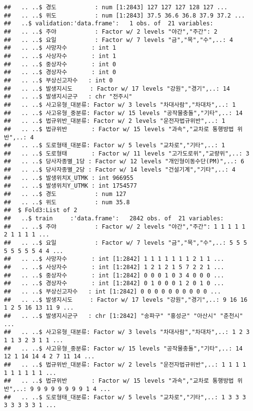 \documentclass[]{article}
\begin{document}
\begin{verbatim}
##   .. ..$ 경도           : num [1:2843] 127 127 127 128 127 ...
##   .. ..$ 위도           : num [1:2843] 37.5 36.6 36.8 37.9 37.2 ...
##   ..$ validation:'data.frame':   1 obs. of  21 variables:
##   .. ..$ 주야           : Factor w/ 2 levels "야간","주간": 2
##   .. ..$ 요일           : Factor w/ 7 levels "금","목","수",..: 4
##   .. ..$ 사망자수       : int 1
##   .. ..$ 사상자수       : int 1
##   .. ..$ 중상자수       : int 0
##   .. ..$ 경상자수       : int 0
##   .. ..$ 부상신고자수   : int 0
##   .. ..$ 발생지시도     : Factor w/ 17 levels "강원","경기",..: 14
##   .. ..$ 발생지시군구   : chr "전주시"
##   .. ..$ 사고유형_대분류: Factor w/ 3 levels "차대사람","차대차",..: 1
##   .. ..$ 사고유형_중분류: Factor w/ 15 levels "공작물충돌","기타",..: 14
##   .. ..$ 법규위반_대분류: Factor w/ 2 levels "운전자법규위반",..: 1
##   .. ..$ 법규위반       : Factor w/ 15 levels "과속","교차로 통행방법 위반",..: 4
##   .. ..$ 도로형태_대분류: Factor w/ 5 levels "교차로","기타",..: 1
##   .. ..$ 도로형태       : Factor w/ 11 levels "고가도로위","교량위",..: 3
##   .. ..$ 당사자종별_1당 : Factor w/ 12 levels "개인형이동수단(PM)",..: 6
##   .. ..$ 당사자종별_2당 : Factor w/ 14 levels "건설기계","기타",..: 4
##   .. ..$ 발생위치X_UTMK : int 966955
##   .. ..$ 발생위치Y_UTMK : int 1754577
##   .. ..$ 경도           : num 127
##   .. ..$ 위도           : num 35.8
##  $ Fold3:List of 2
##   ..$ train     :'data.frame':   2842 obs. of  21 variables:
##   .. ..$ 주야           : Factor w/ 2 levels "야간","주간": 1 1 1 1 1 2 1 1 1 1 ...
##   .. ..$ 요일           : Factor w/ 7 levels "금","목","수",..: 5 5 5 5 5 5 5 5 4 4 ...
##   .. ..$ 사망자수       : int [1:2842] 1 1 1 1 1 1 1 2 1 1 ...
##   .. ..$ 사상자수       : int [1:2842] 1 2 1 2 1 5 7 2 2 1 ...
##   .. ..$ 중상자수       : int [1:2842] 0 0 0 1 0 3 4 0 0 0 ...
##   .. ..$ 경상자수       : int [1:2842] 0 1 0 0 0 1 2 0 1 0 ...
##   .. ..$ 부상신고자수   : int [1:2842] 0 0 0 0 0 0 0 0 0 0 ...
##   .. ..$ 발생지시도     : Factor w/ 17 levels "강원","경기",..: 9 16 16 1 2 5 16 13 11 9 ...
##   .. ..$ 발생지시군구   : chr [1:2842] "송파구" "홍성군" "아산시" "춘천시" ...
##   .. ..$ 사고유형_대분류: Factor w/ 3 levels "차대사람","차대차",..: 1 2 3 1 1 3 2 3 1 1 ...
##   .. ..$ 사고유형_중분류: Factor w/ 15 levels "공작물충돌","기타",..: 14 12 1 14 14 4 2 7 11 14 ...
##   .. ..$ 법규위반_대분류: Factor w/ 2 levels "운전자법규위반",..: 1 1 1 1 1 1 1 1 1 1 ...
##   .. ..$ 법규위반       : Factor w/ 15 levels "과속","교차로 통행방법 위반",..: 9 9 9 9 9 9 9 9 1 4 ...
##   .. ..$ 도로형태_대분류: Factor w/ 5 levels "교차로","기타",..: 1 3 3 3 3 3 3 3 3 1 ...

\end{verbatim}
\end{document}
